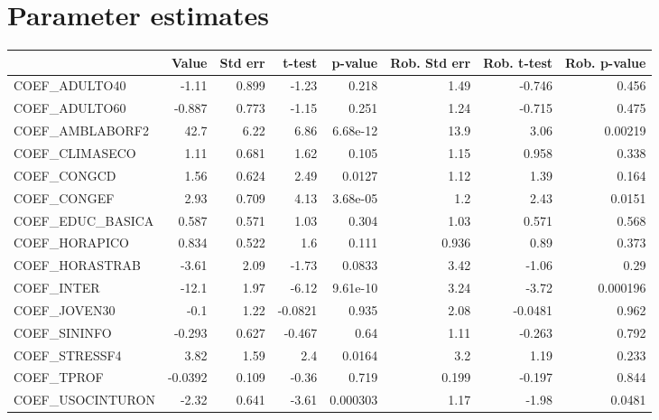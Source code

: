 \section{Parameter estimates}
\begin{tabular}{lrrrrrrr}
\toprule
{} &   Value &  Std err &  t-test &  p-value &  Rob. Std err &  Rob. t-test &  Rob. p-value \\
\midrule
COEF\_ADULTO40      &   -1.11 &    0.899 &   -1.23 &    0.218 &          1.49 &       -0.746 &         0.456 \\
COEF\_ADULTO60      &  -0.887 &    0.773 &   -1.15 &    0.251 &          1.24 &       -0.715 &         0.475 \\
COEF\_AMBLABORF2    &    42.7 &     6.22 &    6.86 & 6.68e-12 &          13.9 &         3.06 &       0.00219 \\
COEF\_CLIMASECO     &    1.11 &    0.681 &    1.62 &    0.105 &          1.15 &        0.958 &         0.338 \\
COEF\_CONGCD        &    1.56 &    0.624 &    2.49 &   0.0127 &          1.12 &         1.39 &         0.164 \\
COEF\_CONGEF        &    2.93 &    0.709 &    4.13 & 3.68e-05 &           1.2 &         2.43 &        0.0151 \\
COEF\_EDUC\_BASICA   &   0.587 &    0.571 &    1.03 &    0.304 &          1.03 &        0.571 &         0.568 \\
COEF\_HORAPICO      &   0.834 &    0.522 &     1.6 &    0.111 &         0.936 &         0.89 &         0.373 \\
COEF\_HORASTRAB     &   -3.61 &     2.09 &   -1.73 &   0.0833 &          3.42 &        -1.06 &          0.29 \\
COEF\_INTER         &   -12.1 &     1.97 &   -6.12 & 9.61e-10 &          3.24 &        -3.72 &      0.000196 \\
COEF\_JOVEN30       &    -0.1 &     1.22 & -0.0821 &    0.935 &          2.08 &      -0.0481 &         0.962 \\
COEF\_SININFO       &  -0.293 &    0.627 &  -0.467 &     0.64 &          1.11 &       -0.263 &         0.792 \\
COEF\_STRESSF4      &    3.82 &     1.59 &     2.4 &   0.0164 &           3.2 &         1.19 &         0.233 \\
COEF\_TPROF         & -0.0392 &    0.109 &   -0.36 &    0.719 &         0.199 &       -0.197 &         0.844 \\
COEF\_USOCINTURON   &   -2.32 &    0.641 &   -3.61 & 0.000303 &          1.17 &        -1.98 &        0.0481 \\

\end{tabular}
